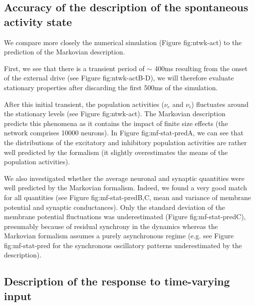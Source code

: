 \documentclass[8pt, colorlinks, a4paper]{article}
\renewcommand\ref{}
\begin{document}
\subsection{Accuracy of the description of the spontaneous activity state}
\label{sec-4-5}

We compare more closely the numerical simulation (Figure
\ref{fig:ntwk-act}) to the prediction of the Markovian description.

First, we see that there is a transient period of \(\sim\) 400ms
resulting from the onset of the external drive (see Figure
\ref{fig:ntwk-act}B-D), we will therefore evaluate stationary properties
after discarding the first 500ms of the simulation.

After this initial transient, the population activities (\(\nu_e\) and
\(\nu_i\)) fluctuates around the stationary levels (see Figure
\ref{fig:ntwk-act}). The Markovian description predicts this phenomena as it
contains the impact of finite size effects (the network comprises
10000 neurons). In Figure \ref{fig:mf-stat-pred}A, we can see that the
distributions of the excitatory and inhibitory population activities
are rather well predicted by the formalism (it slightly overestimates
the means of the population activities).

We also investigated whether the average neuronal and synaptic
quantities were well predicted by the Markovian formalism. Indeed, we
found a very good match for all quantities (see Figure
\ref{fig:mf-stat-pred}B,C, mean and variance of membrane potential and
synaptic conductances). Only the standard deviation of the membrane
potential fluctuations was underestimated (Figure
\ref{fig:mf-stat-pred}C), presumably because of residual synchrony in
the dynamics whereas the Markovian formalism assumes a purely
asynchronous regime (e.g. see Figure \ref{fig:mf-stat-pred} for the
synchronous oscillatory patterns underestimated by the description).

\subsection{Description of the response to time-varying input}
\label{sec-4-6}
\end{document}
